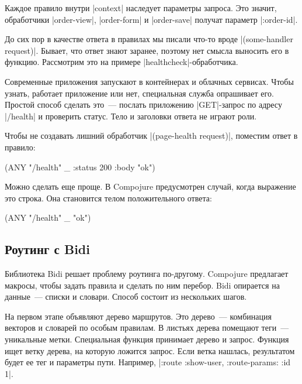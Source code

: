 Каждое правило внутри \spverb|context| наследует параметры запроса. Это значит,
обработчики \spverb|order-view|, \spverb|order-form| и \spverb|order-save|
получат параметр \spverb|:order-id|.

До сих пор в качестве ответа в правилах мы писали что-то вроде
\spverb|(some-handler request)|. Бывает, что ответ знают заранее, поэтому нет
смысла выносить его в функцию. Рассмотрим это на примере
\spverb|healthcheck|-обработчика.

Современные приложения запускают в контейнерах и облачных сервисах. Чтобы
узнать, работает приложение или нет, специальная служба опрашивает его. Простой
способ сделать это~--- послать приложению \spverb|GET|-запрос по адресу
\spverb|/health| и проверить статус. Тело и заголовки ответа не играют роли.

Чтобы не создавать лишний обработчик \spverb|(page-health request)|, поместим
ответ в правило:

\begin{english}
  \begin{clojure}
(ANY "/health" _ {:status 200 :body "ok"})
  \end{clojure}
\end{english}

Можно сделать еще проще. В Compojure предусмотрен случай, когда выражение это
строка. Она становится телом положительного ответа:

\begin{english}
  \begin{clojure}
(ANY "/health" _ "ok")
  \end{clojure}
\end{english}

\subsection{Роутинг с Bidi}

Библиотека Bidi решает проблему роутинга
по-другому. Compojure предлагает макросы, чтобы задать правила и сделать по ним
перебор. Bidi опирается на данные~--- списки и словари. Способ состоит из
нескольких шагов.

На первом этапе объявляют дерево маршрутов. Это дерево~--- комбинация векторов и
словарей по особым правилам. В листьях дерева помещают теги~--- уникальные
метки. Специальная функция принимает дерево и запрос. Функция ищет ветку дерева,
на которую ложится запрос. Если ветка нашлась, результатом будет ее тег и
параметры пути. Например, \spverb|{:route :show-user, :route-params: {:id 1}}|.

